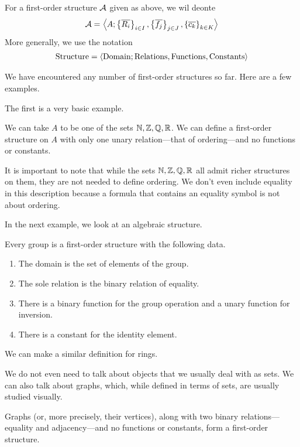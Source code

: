 \begin{boxconvention}
    For a first-order structure $\mathcal{A}$ given as above, we wil deonte
    \begin{align*}
        \mathcal{A} = \left\langle A; \left\{ \overline{R_i} \right\}_{i \in I}, \left\{ \overline{f_j} \right\}_{j \in J}, \left\{ \overline{c_k} \right\}_{k \in K} \right\rangle
    \end{align*}
    More generally, we use the notation
    \begin{align*}
        \text{Structure} = \left\langle \text{Domain}; \text{Relations}, \text{Functions}, \text{Constants} \right\rangle
    \end{align*}
\end{boxconvention}

We have encountered any number of first-order structures so far. Here are a few examples.

The first is a very basic example.
\begin{boxexample}[Orderings]
    We can take $A$ to be one of the sets $\mathbb{N}, \mathbb{Z}, \mathbb{Q}, \mathbb{R}$. We can define a first-order structure on $A$ with only one unary relation---that of ordering---and no functions or constants.
\end{boxexample}
It is important to note that while the sets $\mathbb{N}, \mathbb{Z}, \mathbb{Q}, \mathbb{R}$ all admit richer structures on them, they are not needed to define ordering. We don't even include equality in this description because a formula that contains an equality symbol is not about ordering.

In the next example, we look at an algebraic structure.
\begin{boxexample}[Groups]
    Every group is a first-order structure with the following data.
    \begin{enumerate}
        \item The domain is the set of elements of the group.
        \item The sole relation is the binary relation of equality.
        \item There is a binary function for the group operation and a unary function for inversion.
        \item There is a constant for the identity element.
    \end{enumerate}
\end{boxexample}
We can make a similar definition for rings.

We do not even need to talk about objects that we usually deal with as sets. We can also talk about graphs, which, while defined in terms of sets, are usually studied visually.
\begin{boxexample}[Graphs]
    Graphs (or, more precisely, their vertices), along with two binary relations---equality and adjacency---and no functions or constants, form a first-order structure.
\end{boxexample}

